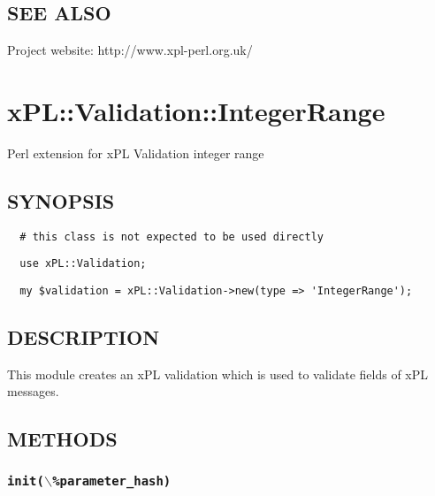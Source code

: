 \documentclass[12pt,a4paper]{article}
\begin{document}
\subsection*{SEE ALSO\label{xPL::Validation::Integer_SEE_ALSO}}


Project website: http://www.xpl-perl.org.uk/

\newpage
\section{xPL::Validation::IntegerRange\label{xPL::Validation::IntegerRange}}


Perl extension for xPL Validation integer range

\subsection*{SYNOPSIS\label{xPL::Validation::IntegerRange_SYNOPSIS}}
\begin{verbatim}
  # this class is not expected to be used directly
\end{verbatim}
\begin{verbatim}
  use xPL::Validation;
\end{verbatim}
\begin{verbatim}
  my $validation = xPL::Validation->new(type => 'IntegerRange');
\end{verbatim}
\subsection*{DESCRIPTION\label{xPL::Validation::IntegerRange_DESCRIPTION}}


This module creates an xPL validation which is used to validate fields
of xPL messages.

\subsection*{METHODS\label{xPL::Validation::IntegerRange_METHODS}}
\subsubsection*{\texttt{init($\backslash$\%parameter\_hash)}\label{xPL::Validation::IntegerRange_init_backslash_parameter_hash_}}
\end{document}
